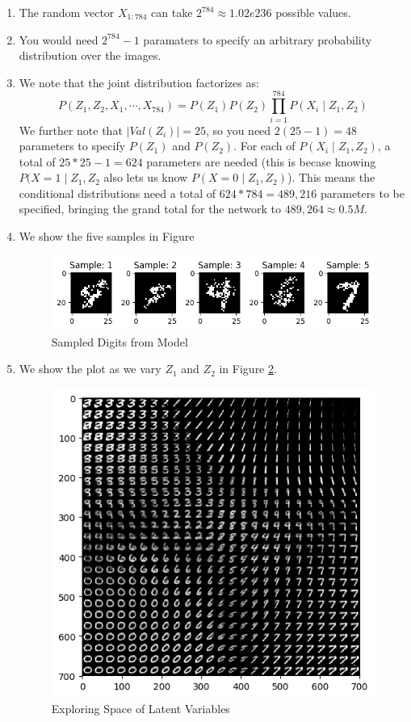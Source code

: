 \documentclass[12pt]{article}
\begin{document}
\begin{enumerate}
\item The random vector $X_{1:784}$ can take $2^{784} \approx 1.02e236$ possible values.
\item You would need $2^{784} - 1$ paramaters to specify an arbitrary probability distribution over the images.
\item We note that the joint distribution factorizes as:
$$
P(Z_1, Z_2, X_1, \cdots, X_{784}) = P(Z_1)P(Z_2)\prod_{i=1}^{784}P(X_i \mid Z_1, Z_2)
$$
We further note that $|Val(Z_i)| = 25$, so you need $2(25-1) = 48$ parameters to specify $P(Z_1)$ and $P(Z_2)$. For each of $P(X_i \mid Z_1, Z_2)$, a total of $25*25 - 1 = 624$ parameters are needed (this is becase knowing $P(X=1 \mid Z_1, Z_2$ also lets us know $P(X = 0 \mid Z_1, Z_2)$). This means the conditional distributions need a total of $624 * 784 = 489,216$ parameters to be specified, bringing the grand total for the network to $489,264 \approx 0.5M$.
\item We show the five samples in Figure 
\begin{figure}[h!]
\centering
\includegraphics{programming/a4.png}
\caption{Sampled Digits from Model}
\label{fig:sampled_digits}
\end{figure}

\item We show the plot as we vary $Z_1$ and $Z_2$ in Figure \ref{fig:latent_variables}.
\begin{figure}[h!]
\centering
\includegraphics{programming/a5.png}
\caption{Exploring Space of Latent Variables}
\label{fig:latent_variables}
\end{figure}


\end{enumerate}
\end{document}
